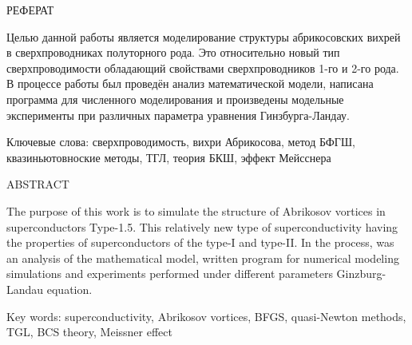 \begin{center}
	РЕФЕРАТ
\end{center}

Целью данной работы является моделирование структуры абрикосовских вихрей в 
сверхпроводниках полуторного рода. Это относительно новый тип сверхпроводимости 
обладающий свойствами сверхпроводников 1-го и 2-го рода. В процессе работы был 
проведён анализ математической модели, написана программа для численного 
моделирования и произведены модельные эксперименты при различных параметра 
уравнения Гинзбурга-Ландау.
\vspace*{1cm}

\noindent Ключевые слова: сверхпроводимость, вихри Абрикосова, метод БФГШ, 
квазиньютовноские методы, ТГЛ, теория БКШ, эффект Мейсснера
\vspace*{1cm}

\begin{center}
    ABSTRACT
\end{center}

The purpose of this work is to simulate the structure of Abrikosov vortices in
superconductors Type-1.5. This relatively new type of superconductivity
having the properties of superconductors of the type-I and type-II. In the 
process, was an analysis of the mathematical model, written program for 
numerical modeling simulations and experiments performed under different 
parameters Ginzburg-Landau equation.

\vspace*{1cm}

\noindent Key words: superconductivity, Abrikosov vortices, BFGS, quasi-Newton 
methods, TGL, BCS theory, Meissner effect

\newpage